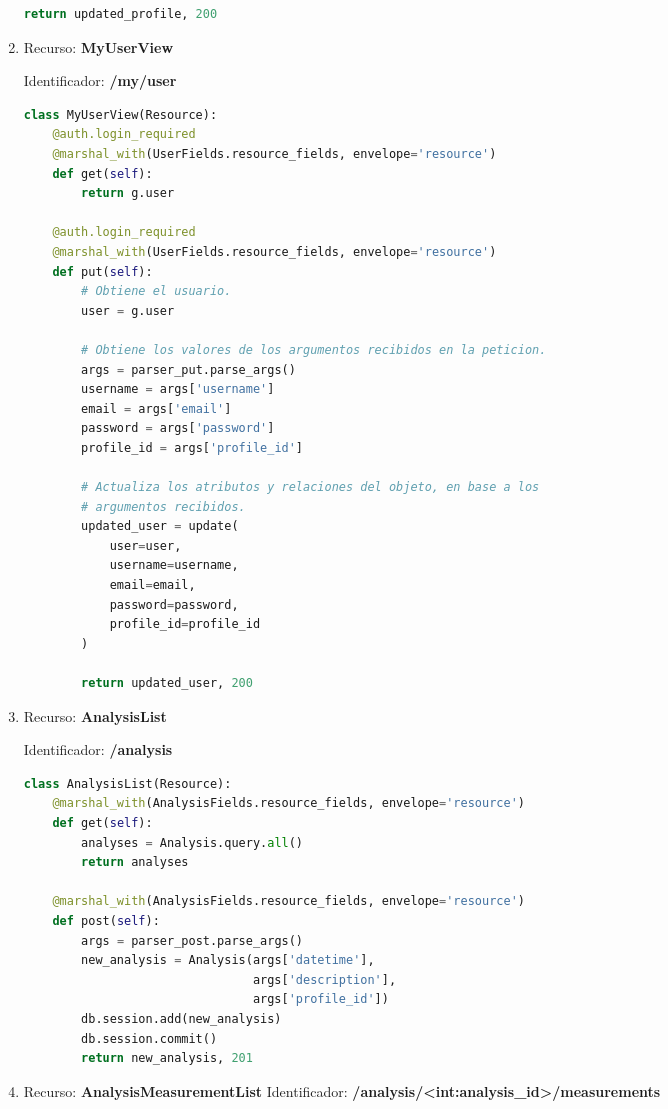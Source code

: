 \begin{enumerate}
\begin{lstlisting}[language=Python]
        return updated_profile, 200
\end{lstlisting}

\item Recurso: \textbf{MyUserView}

Identificador: \textbf{/my/user}

\begin{lstlisting}[language=Python]
class MyUserView(Resource):
    @auth.login_required
    @marshal_with(UserFields.resource_fields, envelope='resource')
    def get(self):
        return g.user

    @auth.login_required
    @marshal_with(UserFields.resource_fields, envelope='resource')
    def put(self):
        # Obtiene el usuario.
        user = g.user

        # Obtiene los valores de los argumentos recibidos en la peticion.
        args = parser_put.parse_args()
        username = args['username']
        email = args['email']
        password = args['password']
        profile_id = args['profile_id']

        # Actualiza los atributos y relaciones del objeto, en base a los
        # argumentos recibidos.
        updated_user = update(
            user=user,
            username=username,
            email=email,
            password=password,
            profile_id=profile_id
        )

        return updated_user, 200
\end{lstlisting}

\item 	Recurso: \textbf{AnalysisList}

Identificador: \textbf{/analysis}

\begin{lstlisting}[language=Python]
class AnalysisList(Resource):
    @marshal_with(AnalysisFields.resource_fields, envelope='resource')
    def get(self):
        analyses = Analysis.query.all()
        return analyses

    @marshal_with(AnalysisFields.resource_fields, envelope='resource')
    def post(self):
        args = parser_post.parse_args()
        new_analysis = Analysis(args['datetime'],
                                args['description'],
                                args['profile_id'])
        db.session.add(new_analysis)
        db.session.commit()
        return new_analysis, 201
\end{lstlisting}

\item Recurso: \textbf{AnalysisMeasurementList}
Identificador: \textbf{/analysis/<int:analysis\_id>/measurements}


\end{enumerate}
